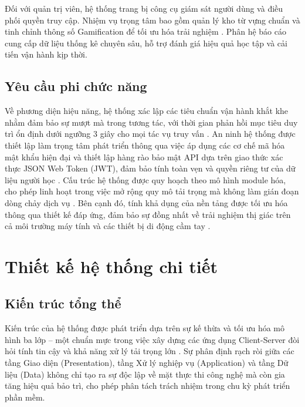 Đối với quản trị viên, hệ thống trang bị công cụ giám sát người dùng và điều phối quyền truy cập. Nhiệm vụ trọng tâm bao gồm quản lý kho từ vựng chuẩn và tinh chỉnh thông số Gamification để tối ưu hóa trải nghiệm \cite{Deterding2011}. Phân hệ báo cáo cung cấp dữ liệu thống kê chuyên sâu, hỗ trợ đánh giá hiệu quả học tập và cải tiến vận hành kịp thời.

\subsection{Yêu cầu phi chức năng}

Về phương diện hiệu năng, hệ thống xác lập các tiêu chuẩn vận hành khắt khe nhằm đảm bảo sự mượt mà trong tương tác, với thời gian phản hồi mục tiêu duy trì ổn định dưới ngưỡng 3 giây cho mọi tác vụ truy vấn \cite{TechEmpower2024}. An ninh hệ thống được thiết lập làm trọng tâm phát triển thông qua việc áp dụng các cơ chế mã hóa mật khẩu hiện đại và thiết lập hàng rào bảo mật API dựa trên giao thức xác thực JSON Web Token (JWT), đảm bảo tính toàn vẹn và quyền riêng tư của dữ liệu người học \cite{MiddlewareDocs2024}. Cấu trúc hệ thống được quy hoạch theo mô hình module hóa, cho phép linh hoạt trong việc mở rộng quy mô tải trọng mà không làm gián đoạn dòng chảy dịch vụ \cite{MicrosoftASPNETCore2024}. Bên cạnh đó, tính khả dụng của nền tảng được tối ưu hóa thông qua thiết kế đáp ứng, đảm bảo sự đồng nhất về trải nghiệm thị giác trên cả môi trường máy tính và các thiết bị di động cầm tay \cite{ReactDocs2024}.

\section{Thiết kế hệ thống chi tiết}
\subsection{Kiến trúc tổng thể}

Kiến trúc của hệ thống được phát triển dựa trên sự kế thừa và tối ưu hóa mô hình ba lớp – một chuẩn mực trong việc xây dựng các ứng dụng Client-Server đòi hỏi tính tin cậy và khả năng xử lý tải trọng lớn \cite{MicrosoftASPNETCore2024}. Sự phân định rạch ròi giữa các tầng Giao diện (Presentation), tầng Xử lý nghiệp vụ (Application) và tầng Dữ liệu (Data) không chỉ tạo ra sự độc lập về mặt thực thi công nghệ mà còn gia tăng hiệu quả bảo trì, cho phép phân tách trách nhiệm trong chu kỳ phát triển phần mềm.


